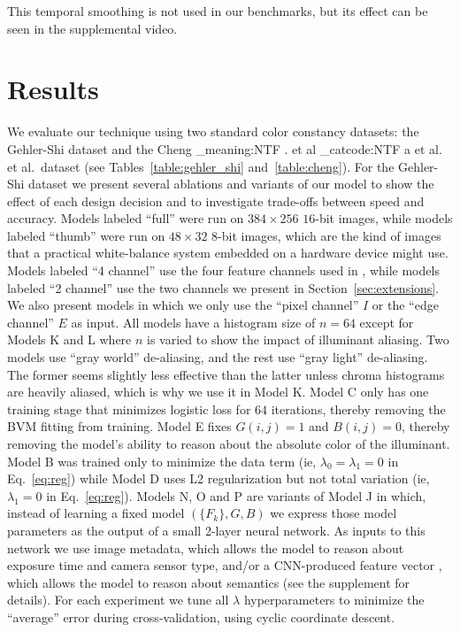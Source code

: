 \documentclass[10pt,twocolumn,letterpaper]{article}
\makeatletter
\newcommand\latinabbrev[1]{
  \peek_meaning:NTF . {%
    #1\@}%
  { \peek_catcode:NTF a {%
      #1.\@ }%
    {#1.\@}}}
\def\etal{\latinabbrev{et al}}
\makeatother
\begin{document}
This temporal smoothing is not used in our benchmarks, but
its effect can be seen in the supplemental video.

\section{Results}
\label{sec:results}

We evaluate our technique using two standard color constancy datasets:
the Gehler-Shi dataset \cite{Gehler08,shifunt}
and the Cheng \etal\ dataset \cite{Cheng14} (see Tables~\ref{table:gehler_shi}
and~\ref{table:cheng}).
For the Gehler-Shi dataset we present several ablations and variants
of our model to show the effect of each design decision
and to investigate trade-offs between speed and accuracy.
Models labeled ``full'' were run on $384 \times 256$ $16$-bit images,
while models labeled ``thumb'' were run on $48 \times 32$ $8$-bit images,
which are the kind of images that
a practical white-balance system embedded on a hardware device might use.
Models labeled ``4 channel'' use the four feature channels used in
\cite{BarronICCV2015}, while models labeled ``2 channel'' use the two
channels we present in Section~\ref{sec:extensions}.
We also present models in which we only use the ``pixel channel'' $I$
or the ``edge channel'' $E$ as input.
All models have a histogram size of $n=64$ except for Models K and L where
$n$ is varied to show the impact of illuminant aliasing.
Two models use ``gray world'' de-aliasing, and the rest use ``gray light''
de-aliasing.
The former seems slightly less effective than the latter unless chroma histograms are heavily aliased, which is why we use it in Model K.
Model C only has one training stage that minimizes logistic loss for $64$ iterations,
thereby removing the BVM fitting from training.
Model E fixes $G(i,j) = 1$ and $B(i,j) = 0$, thereby removing
the model's ability to reason about the absolute color of the illuminant.
Model B was trained only to minimize the data term
(ie, $\lambda_0 = \lambda_1 = 0$ in Eq.~\ref{eq:reg}) while
Model D uses L2 regularization but not total variation
(ie, $\lambda_1 = 0$ in Eq.~\ref{eq:reg}).
Models N, O and P are variants of Model J in which, instead of learning a fixed model $( \{ F_k \}, G, B )$
we express those model parameters as the output of a small 2-layer neural network.
As inputs to this network we use image metadata, which allows the model to reason about exposure time and camera sensor type,
and/or a CNN-produced feature vector \cite{Wang2014}, which allows the model to reason about semantics (see the supplement for details).
For each experiment we tune all $\lambda$ hyperparameters to minimize the
``average'' error during cross-validation, using cyclic coordinate descent.
\end{document}
